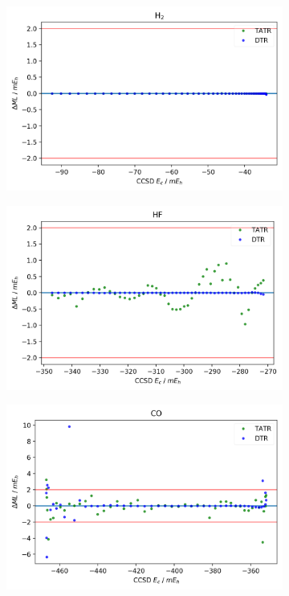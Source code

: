 \newpage
\begin{figure}
    \begin{subfigure}{.5\textwidth}
        \centering
        \includegraphics[scale=.55]{p2/figures/si/H2_e.png}
        \caption{}
        \label{fig:H2}
    \end{subfigure}%
    \begin{subfigure}{.5\textwidth}
        \centering
        \includegraphics[scale=.55]{p2/figures/si/HF_e.png}
        \caption{}
        \label{fig:HF}
    \end{subfigure}
    \begin{subfigure}{.5\textwidth}
        \centering
        \includegraphics[scale=.55]{p2/figures/si/CO_e.png}

\end{subfigure}
\end{figure}
